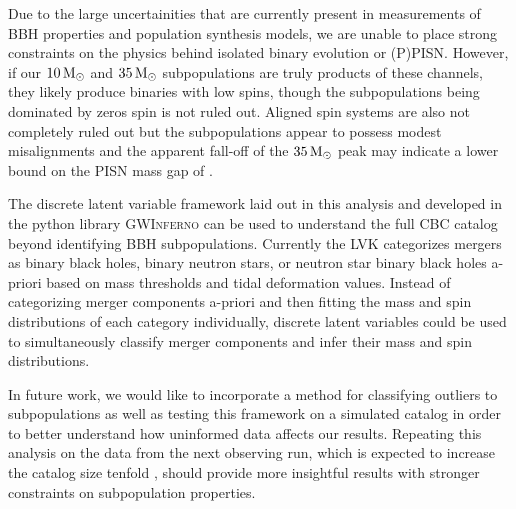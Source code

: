Due to the large uncertainities that are currently present in measurements of BBH properties and population synthesis models, we are unable to place strong constraints on the physics behind isolated binary evolution or (P)PISN. However, if our $10{\,\rm M}_\odot$ and $35{\,\rm M}_\odot$ subpopulations are truly products of these channels, they likely produce binaries with low spins, though the subpopulations being dominated by zeros spin is not ruled out. Aligned spin systems are also not completely ruled out but the subpopulations appear to possess modest misalignments and the apparent fall-off of the $35{\,\rm M}_\odot$ peak may indicate a lower bound on the PISN mass gap of \result{$\CIPlusMinus{\macros[Mass][Composite][ContinuumA][99percentile]}$ \msun}.

The discrete latent variable framework laid out in this analysis and developed in the python library \textsc{GWInferno} can be used to understand the full CBC catalog beyond identifying BBH subpopulations. Currently the LVK categorizes mergers as binary black holes, binary neutron stars, or neutron star binary black holes a-priori based on mass thresholds and tidal deformation values. Instead of categorizing merger components a-priori and then fitting the mass and spin distributions of each category individually, discrete latent variables could be used to simultaneously classify merger components and infer their mass and spin distributions.


In future work, we would like to incorporate a method for classifying outliers to subpopulations as well as testing this framework on a simulated catalog in order to better understand how uninformed data affects our results. Repeating this analysis on the data from the next observing run, which is expected to increase the catalog size tenfold , should provide more insightful results with stronger constraints on subpopulation properties. 